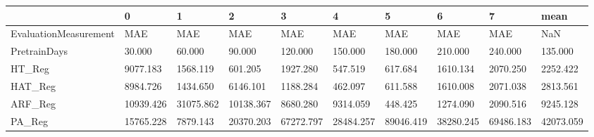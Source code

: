 \begin{tabular}{llllllllll}
\toprule
{} &         0 &         1 &         2 &         3 &         4 &         5 &         6 &         7 &      mean \\
\midrule
EvaluationMeasurement &       MAE &       MAE &       MAE &       MAE &       MAE &       MAE &       MAE &       MAE &       NaN \\
PretrainDays          &    30.000 &    60.000 &    90.000 &   120.000 &   150.000 &   180.000 &   210.000 &   240.000 &   135.000 \\
HT\_Reg                &  9077.183 &  1568.119 &   601.205 &  1927.280 &   547.519 &   617.684 &  1610.134 &  2070.250 &  2252.422 \\
HAT\_Reg               &  8984.726 &  1434.650 &  6146.101 &  1188.284 &   462.097 &   611.588 &  1610.008 &  2071.038 &  2813.561 \\
ARF\_Reg               & 10939.426 & 31075.862 & 10138.367 &  8680.280 &  9314.059 &   448.425 &  1274.090 &  2090.516 &  9245.128 \\
PA\_Reg                & 15765.228 &  7879.143 & 20370.203 & 67272.797 & 28484.257 & 89046.419 & 38280.245 & 69486.183 & 42073.059 \\
\bottomrule
\end{tabular}
